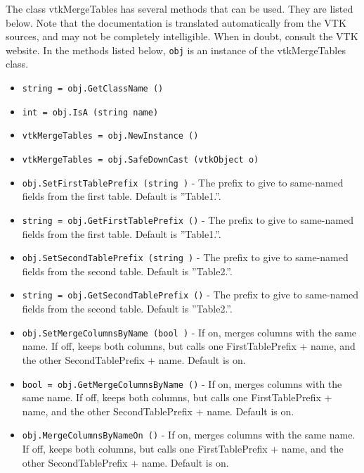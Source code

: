 The class vtkMergeTables has several methods that can be used.
  They are listed below.
Note that the documentation is translated automatically from the VTK sources,
and may not be completely intelligible.  When in doubt, consult the VTK website.
In the methods listed below, \verb|obj| is an instance of the vtkMergeTables class.
\begin{itemize}
\item  \verb|string = obj.GetClassName ()|

\item  \verb|int = obj.IsA (string name)|

\item  \verb|vtkMergeTables = obj.NewInstance ()|

\item  \verb|vtkMergeTables = obj.SafeDownCast (vtkObject o)|

\item  \verb|obj.SetFirstTablePrefix (string )| -  The prefix to give to same-named fields from the first table.
 Default is ''Table1.''.

\item  \verb|string = obj.GetFirstTablePrefix ()| -  The prefix to give to same-named fields from the first table.
 Default is ''Table1.''.

\item  \verb|obj.SetSecondTablePrefix (string )| -  The prefix to give to same-named fields from the second table.
 Default is ''Table2.''.

\item  \verb|string = obj.GetSecondTablePrefix ()| -  The prefix to give to same-named fields from the second table.
 Default is ''Table2.''.

\item  \verb|obj.SetMergeColumnsByName (bool )| -  If on, merges columns with the same name.
 If off, keeps both columns, but calls one
 FirstTablePrefix + name, and the other SecondTablePrefix + name.
 Default is on.

\item  \verb|bool = obj.GetMergeColumnsByName ()| -  If on, merges columns with the same name.
 If off, keeps both columns, but calls one
 FirstTablePrefix + name, and the other SecondTablePrefix + name.
 Default is on.

\item  \verb|obj.MergeColumnsByNameOn ()| -  If on, merges columns with the same name.
 If off, keeps both columns, but calls one
 FirstTablePrefix + name, and the other SecondTablePrefix + name.
 Default is on.


\end{itemize}
